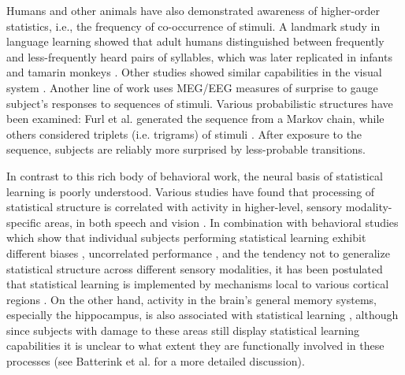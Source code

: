 \documentclass{article}
\theoremstyle{remark}
\newcommand{\1}{\mathbbm{1}}
\begin{document}
Humans and other animals have also demonstrated awareness of higher-order statistics, i.e., the frequency of co-occurrence of stimuli. A landmark study in language learning \cite{saffran1996word} showed that adult humans distinguished between frequently and less-frequently heard pairs of syllables, which was later replicated in infants \cite{saffran1996statistical} and tamarin monkeys \cite{hauser2001segmentation}. Other studies showed similar capabilities in the visual system \cite{fiser2001unsupervised, turk2005automaticity}. Another line of work uses MEG/EEG measures of surprise to gauge subject's responses to sequences of stimuli. Various probabilistic structures have been examined: Furl et al. \cite{furl2011neural} generated the sequence from a Markov chain, while others considered triplets (i.e. trigrams) of stimuli \cite{paraskevopoulos2012statistical, daikoku2014implicit, daikoku2015statistical}. After exposure to the sequence, subjects are reliably more surprised by less-probable transitions.

In contrast to this rich body of behavioral work, the neural basis of statistical learning is poorly understood. Various studies have found that processing of statistical structure is correlated with activity in higher-level, sensory modality-specific areas, in both speech \cite{mcnealy2006cracking, cunillera2009time, karuza2013neural} and vision \cite{turk2009neural, karuza2017neural}. In combination with behavioral studies which show that individual subjects performing statistical learning exhibit different biases \cite{conway2005modality}, uncorrelated performance \cite{siegelman2015statistical}, and the tendency not to generalize statistical structure \cite{conway2006statistical} across different sensory modalities, it has been postulated that statistical learning is implemented by mechanisms local to various cortical regions \cite{frost2015domain}. On the other hand, activity in the brain's general memory systems, especially the hippocampus, is also associated with statistical learning \cite{turk2010implicit, schapiro2012shaping}, although since subjects with damage to these areas still display statistical learning capabilities \cite{covington2018necessity} it is unclear to what extent they are functionally involved in these processes (see Batterink et al. \cite{batterink2019understanding} for a more detailed discussion).
\end{document}
